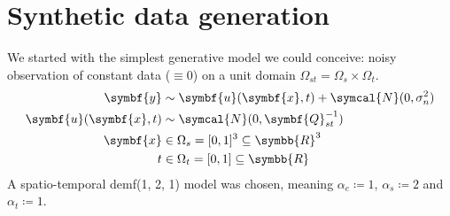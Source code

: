 \documentclass[british]{scrreprt}
\begin{document}
\section{Synthetic data generation}
\label{sec:synthetic-data}
We started with the simplest generative model we could conceive: noisy observation of constant data (\( \equiv 0 \)) on a unit domain \( \Omega_{st} = \Omega_{s} \times \Omega_{t} \).
\begin{align}
    \symbf{y} &\sim \symbf{u}(\symbf{x}, t) + \symcal{N}(0, \sigma_{n}^{2}) \\
    \symbf{u}(\symbf{x}, t) &\sim \symcal{N}(0, \symbf{Q}_{st}^{-1}) \\
    \symbf{x} &\in \Omega_{s} = [0, 1]^{3} \subseteq \symbb{R}^{3} \\
    t &\in \Omega_{t} = [0, 1] \subseteq \symbb{R}
\end{align}
A spatio-temporal \gls{demf}(1, 2, 1) model was chosen, meaning \( \alpha_{e} \coloneqq 1\), \( \alpha_{s} \coloneqq 2 \) and \( \alpha_{t} \coloneq 1 \).
\end{document}
